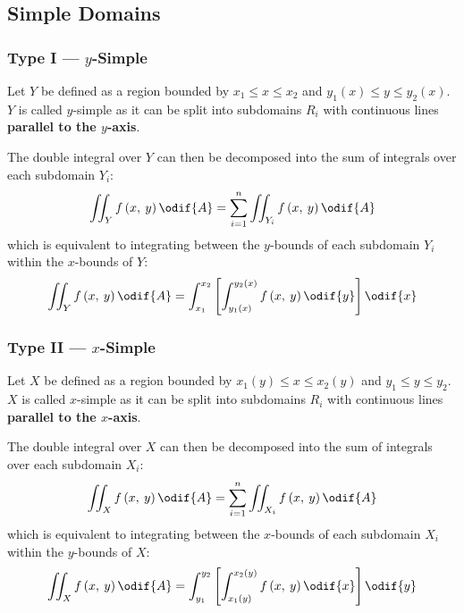 \documentclass{article}
\begin{document}
\subsection{Simple Domains}
\subsubsection{Type I --- \texorpdfstring{\(y\)}{y}-Simple}
Let \(Y\) be defined as a region bounded by
\(x_1 \leqslant x \leqslant x_2\) and
\(y_1\left( x \right) \leqslant y \leqslant y_2\left( x \right)\).
\(Y\) is called \(y\)-simple as it can be split into subdomains \(R_i\)
with continuous lines \textbf{parallel to the \(y\)-axis}.

The double integral over \(Y\) can then be decomposed into the sum of
integrals over each subdomain \(Y_i\):
\begin{equation*}
    \iint_Y f\left( x,\: y \right) \odif{A} = \sum_{i = 1}^n \iint_{Y_i} f\left( x,\: y \right) \odif{A}
\end{equation*}
which is equivalent to integrating between the \(y\)-bounds of each
subdomain \(Y_i\) within the \(x\)-bounds of \(Y\):
\begin{equation*}
    \iint_Y f\left( x,\: y \right) \odif{A} = \int_{x_1}^{x_2} \left[ \int_{y_1\left( x \right)}^{y_2\left( x \right)} f\left( x,\: y \right) \odif{y} \right] \odif{x}
\end{equation*}
\subsubsection{Type II --- \texorpdfstring{\(x\)}{x}-Simple}
Let \(X\) be defined as a region bounded by
\(x_1\left( y \right) \leqslant x \leqslant x_2\left( y \right)\) and
\(y_1 \leqslant y \leqslant y_2\).
\(X\) is called \(x\)-simple as it can be split into subdomains \(R_i\)
with continuous lines \textbf{parallel to the \(x\)-axis}.

The double integral over \(X\) can then be decomposed into the sum of
integrals over each subdomain \(X_i\):
\begin{equation*}
    \iint_X f\left( x,\: y \right) \odif{A} = \sum_{i = 1}^n \iint_{X_i} f\left( x,\: y \right) \odif{A}
\end{equation*}
which is equivalent to integrating between the \(x\)-bounds of each
subdomain \(X_i\) within the \(y\)-bounds of \(X\):
\begin{equation*}
    \iint_X f\left( x,\: y \right) \odif{A} = \int_{y_1}^{y_2} \left[ \int_{x_1\left( y \right)}^{x_2\left( y \right)} f\left( x,\: y \right) \odif{x} \right] \odif{y}
\end{equation*}
\end{document}
